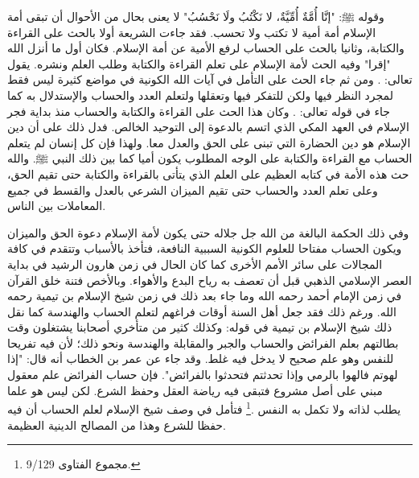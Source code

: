 وقوله ﷺ: "إنَّا أُمَّةٌ أُمِّيَّةٌ، لا نَكْتُبُ ولَا نَحْسُبُ" لا يعنى بحال من الأحوال أن تبقى أمة الإسلام أمة أمية لا تكتب ولا تحسب.  فقد جاءت الشريعة أولا بالحث على القراءة والكتابة، وثانيا بالحث على الحساب لرفع الأمية عن أمة الإسلام. فكان أول ما أنزل الله "إقرا" وفيه الحث لأمة الإسلام على تعلم القراءة والكتابة وطلب العلم ونشره. يقول تعالى:
\quranayah*[96][1-5]{\footnotesize \surahname*[96]}.
ومن ثم جاء الحث على التأمل في آيات الله الكونية في مواضع كثيرة ليس فقط لمجرد النظر فيها ولكن للتفكر فيها وتعقلها ولتعلم العدد والحساب والإستدلال به كما جاء في قوله تعالى: \quranayah*[10][5]{\footnotesize \surahname*[10]}. وكان هذا الحث على القراءة والكتابة والحساب منذ بداية فجر الإسلام في العهد المكي الذي اتسم بالدعوة إلى التوحيد الخالص. فدل ذلك على أن دين الإسلام هو دين الحضارة التي تبنى على الحق والعدل معا. ولهذا فإن كل إنسان لم يتعلم الحساب مع القراءة والكتابة على الوجه المطلوب يكون أميا كما بين ذلك النبي ﷺ. والله حث هذه الأمة في كتابه العظيم على العلم الذي يتأتى بالقراءة والكتابة حتى تقيم الحق، وعلى تعلم العدد والحساب حتى تقيم الميزان الشرعي بالعدل والقسط في جميع المعاملات بين الناس. 

وفي ذلك الحكمة البالغة من الله جل جلاله حتى يكون لأمة الإسلام دعوة الحق والميزان ويكون الحساب مفتاحا للعلوم الكونية السببية النافعة، فتأخذ بالأسباب وتتقدم في كافة المجالات على سائر الأمم الأخرى كما كان الحال في زمن هارون الرشيد في بداية العصر الإسلامي الذهبي قبل أن تعصف به رياح البدع والأهواء. وبالأخص فتنة خلق القرآن في زمن الإمام أحمد رحمه الله وما جاء بعد ذلك في زمن شيخ الإسلام بن تيمية رحمه الله. ورغم ذلك فقد جعل أهل السنة أوقات فراغهم لتعلم الحساب والهندسة كما نقل ذلك شيخ الإسلام بن تيمية في قوله: وكذلك كثير من متأخري أصحابنا يشتغلون وقت بطالتهم بعلم الفرائض والحساب والجبر والمقابلة والهندسة ونحو ذلك؛ لأن فيه تفريحا للنفس وهو علم صحيح لا يدخل فيه غلط. وقد جاء عن عمر بن الخطاب أنه قال: "إذا لهوتم فالهوا بالرمي وإذا تحدثتم فتحدثوا بالفرائض". فإن حساب الفرائض علم معقول مبني على أصل مشروع فتبقى فيه رياضة العقل وحفظ الشرع. لكن ليس هو علما يطلب لذاته ولا تكمل به النفس \href{https://shamela.ws/book/7289/4394#p1}{\faExternalLink} \cite{ibnTaimia_Majmoo}.\footnote{مجموع الفتاوى 9/129.} فتأمل في وصف شيخ الإسلام لعلم الحساب أن فيه حفظا للشرع وهذا من المصالح الدينية العظيمة.

